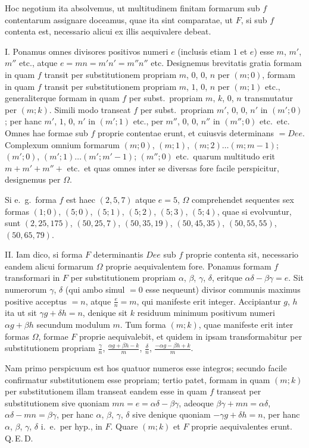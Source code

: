 \documentclass[12pt,a4paper]{article}
\theoremstyle{plain}
\theoremstyle{definition}
\theoremstyle{remark}
\begin{document}
Hoc negotium ita absolvemus, ut multitudinem finitam formarum sub $f$ contentarum assignare doceamus, quae ita sint comparatae, ut $F$, si sub $f$ contenta est, necessario alicui ex illis aequivalere debeat.

I. Ponamus omnes divisores positivos numeri $e$ (inclusis etiam $1$ et $e$) esse $m$, $m'$, $m''$ etc., atque $e=mn=m'n'=m''n''$ etc. Designemus brevitatis gratia formam in quam $f$ transit per substitutionem propriam $m$, $0$, $0$, $n$ per $(m;0)$, formam in quam $f$ transit per substitutionem propriam $m$, $1$, $0$, $n$ per $(m;1)$ etc., generaliterque formam in quam $f$ per subst.\ propriam $m$, $k$, $0$, $n$ transmutatur per $(m;k)$. Simili modo transeat $f$ per subst.\ propriam $m'$, $0$, $0$, $n'$ in $(m';0)$; per hanc $m'$, $1$, $0$, $n'$ in $(m';1)$ etc., per $m''$, $0$, $0$, $n''$ in $(m'';0)$ etc.\ etc. Omnes hae formae sub $f$ proprie contentae erunt, et cuiusvis determinans $=Dee$. Complexum omnium formarum $(m;0)$, $(m;1)$, $(m;2)\ldots(m;m-1)$; $(m';0)$, $(m';1)\ldots(m';m'-1)$; $(m'';0)$ etc.\ quarum multitudo erit $m+m'+m''+$ etc.\ et quas omnes inter se diversas fore facile perspicitur, designemus per $\Omega$.

Si e.\ g.\ forma $f$ est haec $(2,5,7)$ atque $e=5$, $\Omega$ comprehendet sequentes sex formas $(1;0)$, $(5;0)$, $(5;1)$, $(5;2)$, $(5;3)$, $(5;4)$, quae si evolvuntur, sunt $(2,25,175)$, $(50,25,7)$, $(50,35,19)$, $(50,45,35)$, $(50,55,55)$, $(50,65,79)$.

II. Iam dico, si forma $F$ determinantis $Dee$ sub $f$ proprie contenta sit, necessario eandem alicui formarum $\Omega$ proprie aequivalentem fore. Ponamus formam $f$ transformari in $F$ per substitutionem propriam $\alpha$, $\beta$, $\gamma$, $\delta$, eritque $\alpha\delta-\beta\gamma=e$. Sit numerorum $\gamma$, $\delta$ (qui ambo simul $=0$ esse nequeunt) divisor communis maximus positive acceptus $=n$, atque $\frac{e}{n}=m$, qui manifeste erit integer. Accipiantur $g$, $h$ ita ut sit $\gamma g+\delta h=n$, denique sit $k$ residuum minimum positivum numeri $\alpha g+\beta h$ secundum modulum $m$. Tum forma $(m;k)$, quae manifeste erit inter formas $\Omega$, formae $F$ proprie aequivalebit, et quidem in ipsam transformabitur per substitutionem propriam $\frac{\gamma}{n}$, $\frac{\alpha g+\beta h-k}{m}$, $\frac{\delta}{n}$, $\frac{-\alpha g-\beta h+k}{m}$.

Nam primo perspicuum est hos quatuor numeros esse integros; secundo facile confirmatur substitutionem esse propriam; tertio patet, formam in quam $(m;k)$ per substitutionem illam transeat eandem esse in quam $f$ transeat per substitutionem sive quoniam $mn=e=\alpha\delta-\beta\gamma$, adeoque $\beta\gamma+mn=\alpha\delta$, $\alpha\delta-mn=\beta\gamma$, per hanc $\alpha$, $\beta$, $\gamma$, $\delta$ sive denique quoniam $-\gamma g+\delta h=n$, per hanc $\alpha$, $\beta$, $\gamma$, $\delta$ i.\ e.\ per hyp., in $F$. Quare $(m;k)$ et $F$ proprie aequivalentes erunt. Q.\,E.\,D.
\end{document}
